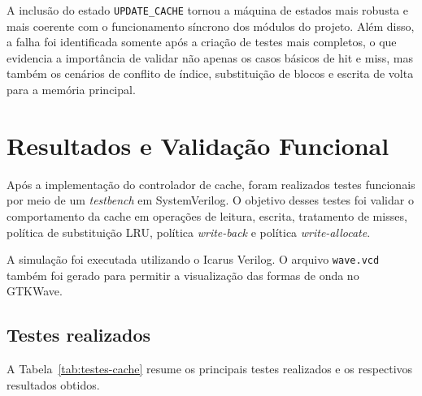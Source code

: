 ﻿\documentclass[12pt,a4paper]{article}
\begin{document}
A inclusão do estado \texttt{UPDATE\_CACHE} tornou a máquina de estados mais robusta e mais coerente com o funcionamento síncrono dos módulos do projeto. Além disso, a falha foi identificada somente após a criação de testes mais completos, o que evidencia a importância de validar não apenas os casos básicos de hit e miss, mas também os cenários de conflito de índice, substituição de blocos e escrita de volta para a memória principal.

\section{Resultados e Validação Funcional}

Após a implementação do controlador de cache, foram realizados testes funcionais por meio de um \textit{testbench} em SystemVerilog. O objetivo desses testes foi validar o comportamento da cache em operações de leitura, escrita, tratamento de misses, política de substituição LRU, política \textit{write-back} e política \textit{write-allocate}.

A simulação foi executada utilizando o Icarus Verilog. O arquivo \texttt{wave.vcd} também foi gerado para permitir a visualização das formas de onda no GTKWave.

\subsection{Testes realizados}

A Tabela~\ref{tab:testes-cache} resume os principais testes realizados e os respectivos resultados obtidos.
\end{document}
